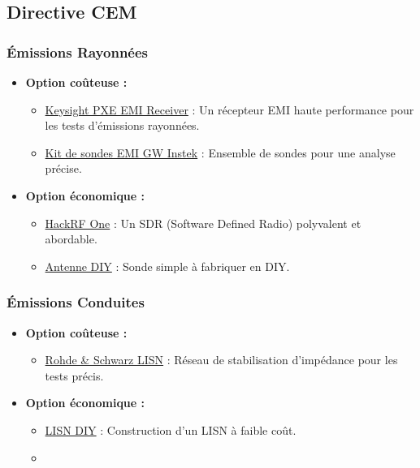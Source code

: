\documentclass[a4paper,12pt]{article}
\begin{document}
\subsection{Directive CEM}
\subsubsection{Émissions Rayonnées}
\begin{itemize}
    \item \textbf{Option coûteuse :}
          \begin{itemize}
              \item \href{https://www.keysight.com/us/en/product/N9048B/pxe-emi-receiver-1-hz-44-ghz.html}{Keysight PXE EMI Receiver} : Un récepteur EMI haute performance pour les tests d'émissions rayonnées.
              \item \href{https://eleshop.fr/gw-instek-gkt-008-emi-probe-kit.html}{Kit de sondes EMI GW Instek} : Ensemble de sondes pour une analyse précise.
          \end{itemize}
    \item \textbf{Option économique :}
          \begin{itemize}
              \item \href{https://greatscottgadgets.com/hackrf/one/}{HackRF One} : Un SDR (Software Defined Radio) polyvalent et abordable.
              \item \href{https://www.youtube.com/watch?v=2xy3Hm1_ZqI}{Antenne DIY} : Sonde simple à fabriquer en DIY.
          \end{itemize}
\end{itemize}

\subsubsection{Émissions Conduites}
\begin{itemize}
    \item \textbf{Option coûteuse :}
          \begin{itemize}
              \item \href{https://www.rohde-schwarz.com/fr/produits/test-et-mesure/tests-conduits/rs-hm6050-two-line-v-network-lisn_63493-48135.html}{Rohde \& Schwarz LISN} : Réseau de stabilisation d'impédance pour les tests précis.
          \end{itemize}
    \item \textbf{Option économique :}
          \begin{itemize}
              \item \href{https://hackaday.io/project/181265-diy-cispr-25-lisn}{LISN DIY} : Construction d’un LISN à faible coût.
              \item %
          \end{itemize}
\end{itemize}
\end{document}
